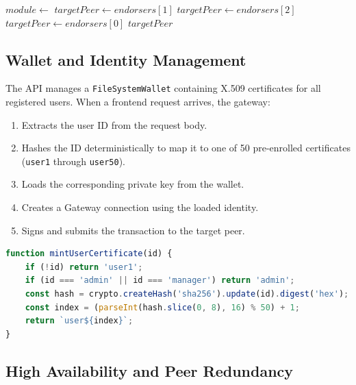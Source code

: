 \begin{algorithm}[H]
\caption{Smart Transaction Routing}
\label{alg:routing}
\begin{algorithmic}[1]
    \State $module \gets$ 
        \State $targetPeer \gets endorsers[1]$ 
        \State $targetPeer \gets endorsers[2]$ 
    \Else
        \State $targetPeer \gets endorsers[0]$ 
    \EndIf
    \State \Return $targetPeer$
\EndProcedure
\end{algorithmic}
\end{algorithm}

\subsection{Wallet and Identity Management}

The API manages a \texttt{FileSystemWallet} containing X.509 certificates for all registered users. When a frontend request arrives, the gateway:

\begin{enumerate}
    \item Extracts the user ID from the request body.
    \item Hashes the ID deterministically to map it to one of 50 pre-enrolled certificates (\texttt{user1} through \texttt{user50}).
    \item Loads the corresponding private key from the wallet.
    \item Creates a Gateway connection using the loaded identity.
    \item Signs and submits the transaction to the target peer.
\end{enumerate}

\begin{lstlisting}[language=JavaScript, caption={Identity Mapping Function (app.js)}]
function mintUserCertificate(id) {
    if (!id) return 'user1';
    if (id === 'admin' || id === 'manager') return 'admin';
    const hash = crypto.createHash('sha256').update(id).digest('hex');
    const index = (parseInt(hash.slice(0, 8), 16) % 50) + 1;
    return `user${index}`;
}
\end{lstlisting}

\subsection{High Availability and Peer Redundancy}

